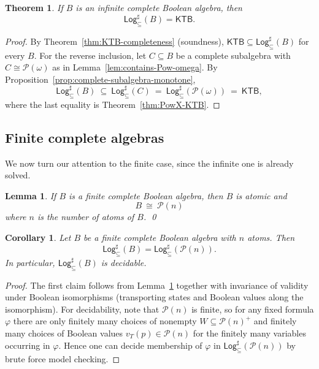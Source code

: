 \documentclass[11pt]{amsart}
\theoremstyle{definition}
\theoremstyle{plain}
\newtheorem{theorem}[definition]{Theorem}
\newtheorem{lemma}[definition]{Lemma}
\newtheorem{corollary}[definition]{Corollary}
\newcommand{\Pow}{\mathcal P}
\newcommand{\KTB}{\mathsf{KTB}}
\newcommand{\Logsub}{\mathsf{Log}_{\subseteq}^{\sharp}}
\begin{document}
\begin{theorem}\label{thm:infinite-algebras-KTB}
If $B$ is an infinite complete Boolean algebra, then
\[
\Logsub(B)=\KTB.
\]
\end{theorem}

\begin{proof}
By Theorem~\ref{thm:KTB-completeness} (soundness), $\KTB\subseteq \Logsub(B)$ for every $B$.
For the reverse inclusion, let $C\subseteq B$ be a complete subalgebra with $C\cong \Pow(\omega)$ as in
Lemma~\ref{lem:contains-Pow-omega}.
By Proposition~\ref{prop:complete-subalgebra-monotone},
\[
\Logsub(B)\ \subseteq\ \Logsub(C)
\ =\ \Logsub(\Pow(\omega))
\ =\ \KTB,
\]
where the last equality is Theorem~\ref{thm:PowX-KTB}.
\end{proof}

\subsection{Finite complete algebras}\label{subsec:finite-algebras}

We now turn our attention to the finite case, since the infinite one is already solved.

\begin{lemma}\label{lem:finite-powerset-algebra}
If $B$ is a finite complete Boolean algebra, then $B$ is atomic and
\[
B\ \cong\ \Pow(n)
\]
where $n$ is the number of atoms of $B$. \qed
\end{lemma}

\begin{corollary}\label{cor:finite-reduction-decidable}
Let $B$ be a finite complete Boolean algebra with $n$ atoms. Then
\[
\Logsub(B)=\Logsub(\Pow(n)).
\]
In particular, $\Logsub(B)$ is decidable.
\end{corollary}

\begin{proof}
The first claim follows from Lemma~\ref{lem:finite-powerset-algebra} together with invariance of validity under
Boolean isomorphisms (transporting states and Boolean values along the isomorphism).
For decidability, note that $\Pow(n)$ is finite, so for any fixed formula $\varphi$ there are only finitely many
choices of nonempty $W\subseteq \Pow(n)^+$ and finitely many choices of Boolean values $v_T(p)\in\Pow(n)$ for the finitely
many variables occurring in $\varphi$. Hence one can decide membership of $\varphi$ in $\Logsub(\Pow(n))$
by brute force model checking.
\end{proof}
\end{document}
